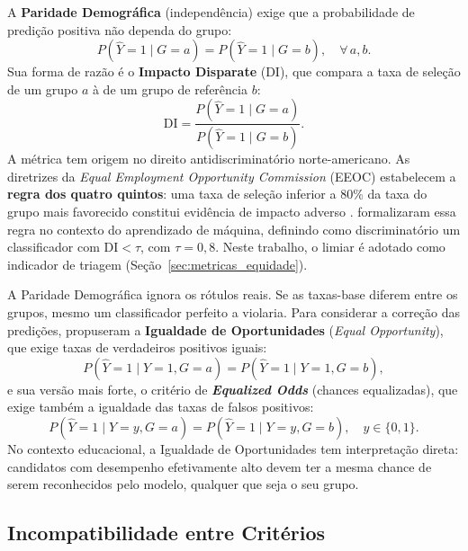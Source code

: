 A \textbf{Paridade Demográfica} (independência) exige que a probabilidade de predição positiva não dependa do grupo:
\begin{equation}
P(\hat{Y} = 1 \mid G = a) = P(\hat{Y} = 1 \mid G = b), \quad \forall\, a, b.
\label{eq:rt_dp}
\end{equation}
Sua forma de razão é o \textbf{Impacto Disparate} (DI), que compara a taxa de seleção de um grupo $a$ à de um grupo de referência $b$:
\begin{equation}
\mathrm{DI} = \frac{P(\hat{Y} = 1 \mid G = a)}{P(\hat{Y} = 1 \mid G = b)}.
\label{eq:rt_di}
\end{equation}
A métrica tem origem no direito antidiscriminatório norte-americano. As diretrizes da \textit{Equal Employment Opportunity Commission} (EEOC) estabelecem a \textbf{regra dos quatro quintos}: uma taxa de seleção inferior a 80\% da taxa do grupo mais favorecido constitui evidência de impacto adverso \cite{eeoc1978uniform}.  formalizaram essa regra no contexto do aprendizado de máquina, definindo como discriminatório um classificador com $\mathrm{DI} < \tau$, com $\tau = 0{,}8$. Neste trabalho, o limiar é adotado como indicador de triagem (Seção~\ref{sec:metricas_equidade}).

A Paridade Demográfica ignora os rótulos reais. Se as taxas-base diferem entre os grupos, mesmo um classificador perfeito a violaria. Para considerar a correção das predições,  propuseram a \textbf{Igualdade de Oportunidades} (\textit{Equal Opportunity}), que exige taxas de verdadeiros positivos iguais:
\begin{equation}
P(\hat{Y} = 1 \mid Y = 1, G = a) = P(\hat{Y} = 1 \mid Y = 1, G = b),
\label{eq:rt_eo}
\end{equation}
e sua versão mais forte, o critério de \textbf{\textit{Equalized Odds}} (chances equalizadas), que exige também a igualdade das taxas de falsos positivos:
\begin{equation}
P(\hat{Y} = 1 \mid Y = y, G = a) = P(\hat{Y} = 1 \mid Y = y, G = b), \quad y \in \{0, 1\}.
\label{eq:rt_eodds}
\end{equation}
No contexto educacional, a Igualdade de Oportunidades tem interpretação direta: candidatos com desempenho efetivamente alto devem ter a mesma chance de serem reconhecidos pelo modelo, qualquer que seja o seu grupo.

\subsection{Incompatibilidade entre Critérios}

